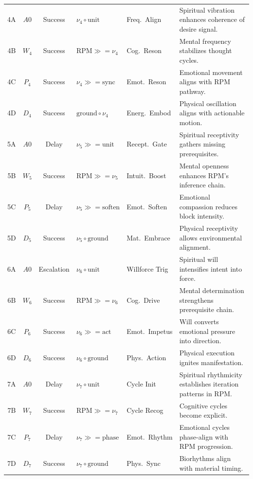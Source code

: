 \begin{longtable}{c|c|c|p{2cm}|p{1.5cm}|p{4.5cm}}
4A & $A0$ & Success &
$\nu_4 \circ \text{unit}$ &
Freq.\ Align &
Spiritual vibration enhances coherence of desire signal.
\\
4B & $W_4$ & Success &
$\text{RPM} \gg= \nu_4$ &
Cog.\ Reson &
Mental frequency stabilizes thought cycles.
\\
4C & $P_4$ & Success &
$\nu_4 \gg= \text{sync}$ &
Emot.\ Reson &
Emotional movement aligns with RPM pathway.
\\
4D & $D_4$ & Success &
$\text{ground} \circ \nu_4$ &
Energ.\ Embod &
Physical oscillation aligns with actionable motion.
\\
\midrule

5A & $A0$ & Delay &
$\nu_5 \gg= \text{unit}$ &
Recept.\ Gate &
Spiritual receptivity gathers missing prerequisites.
\\
5B & $W_5$ & Success &
$\text{RPM} \gg= \nu_5$ &
Intuit.\ Boost &
Mental openness enhances RPM's inference chain.
\\
5C & $P_5$ & Delay &
$\nu_5 \gg= \text{soften}$ &
Emot.\ Soften &
Emotional compassion reduces block intensity.
\\
5D & $D_5$ & Success &
$\nu_5 \circ \text{ground}$ &
Mat.\ Embrace &
Physical receptivity allows environmental alignment.
\\
\midrule

6A & $A0$ & Escalation &
$\nu_6 \circ \text{unit}$ &
Willforce Trig &
Spiritual will intensifies intent into force.
\\
6B & $W_6$ & Success &
$\text{RPM} \gg= \nu_6$ &
Cog.\ Drive &
Mental determination strengthens prerequisite chain.
\\
6C & $P_6$ & Success &
$\nu_6 \gg= \text{act}$ &
Emot.\ Impetus &
Will converts emotional pressure into direction.
\\
6D & $D_6$ & Success &
$\nu_6 \circ \text{ground}$ &
Phys.\ Action &
Physical execution ignites manifestation.
\\
\midrule

7A & $A0$ & Delay &
$\nu_7 \circ \text{unit}$ &
Cycle Init &
Spiritual rhythmicity establishes iteration patterns in RPM.
\\
7B & $W_7$ & Success &
$\text{RPM} \gg= \nu_7$ &
Cycle Recog &
Cognitive cycles become explicit.
\\
7C & $P_7$ & Delay &
$\nu_7 \gg= \text{phase}$ &
Emot.\ Rhythm &
Emotional cycles phase-align with RPM progression.
\\
7D & $D_7$ & Success &
$\nu_7 \circ \text{ground}$ &
Phys.\ Sync &
Biorhythms align with material timing.
\\

\end{longtable}
\normalsize

